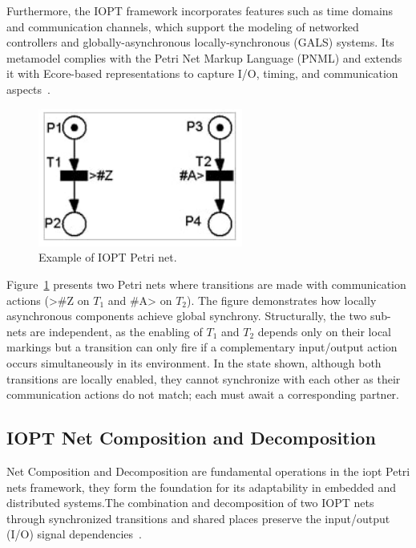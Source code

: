 Furthermore, the IOPT framework incorporates features such as time domains and communication channels, which support the modeling of networked controllers and globally-asynchronous locally-synchronous (GALS) systems. Its metamodel complies with the Petri Net Markup Language (PNML) and extends it with Ecore-based representations to capture I/O, timing, and communication aspects~\cite{iopttools}.


\begin{figure}[htbp]
  \centering
  \includegraphics[width=0.6\textwidth]{Chapters/Figures/petrisplit.jpg}
  \caption{Example of IOPT Petri net.}
  \label{fig:petrisplit}
\end{figure}


Figure~\ref{fig:petrisplit} presents two Petri nets where transitions are made with communication actions (>\#Z on $T_1$ and \#A> on $T_2$). The figure demonstrates how locally asynchronous components achieve global synchrony. Structurally, the two sub-nets are independent, as the enabling of $T_1$ and $T_2$ depends only on their local markings but a transition can only fire if a complementary input/output action occurs simultaneously in its environment. In the state shown, although both transitions are locally enabled, they cannot synchronize with each other as their communication actions do not match; each must await a corresponding partner.



\subsection{IOPT Net Composition and Decomposition}
\label{sub:net_addicion}

Net Composition and Decomposition are fundamental operations in the \gls{iopt} Petri nets framework, they form the foundation for its adaptability in embedded and distributed systems.The combination and decomposition of two IOPT nets through synchronized transitions and shared places preserve the input/output (I/O) signal dependencies~\cite{add1}.

